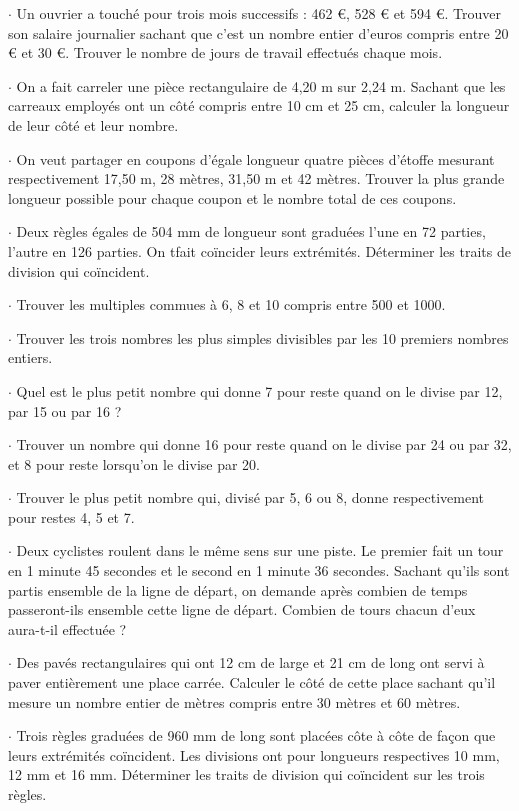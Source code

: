 $\cdot$    Un ouvrier a touché pour trois mois successifs : 462 €, 528 € et 594 €. Trouver son salaire journalier sachant que c'est un nombre entier d'euros compris entre 20 € et 30 €. Trouver le nombre de jours de travail effectués chaque mois. 
 
$\cdot$  On a fait carreler une pièce rectangulaire de 4,20 m sur 2,24 m. Sachant que les carreaux employés ont un côté compris entre 10 cm et 25 cm, calculer la longueur de leur côté et leur nombre. 

$\cdot$  On veut partager en coupons d'égale longueur quatre pièces d'étoffe mesurant respectivement 17,50 m, 28 mètres, 31,50 m et 42 mètres. Trouver la plus grande longueur possible pour chaque coupon et le nombre total de ces coupons. 
 
$\cdot$   Deux règles égales de 504 mm de longueur sont graduées l'une en 72 parties, l'autre en  126 parties. On tfait coïncider  leurs extrémités. Déterminer les traits de division qui coïncident.
 
$\cdot$  Trouver les multiples commues à 6, 8 et 10 compris entre 500 et 1000. 

$\cdot$  Trouver les trois nombres les plus simples divisibles par les 10 premiers nombres entiers. 
 
$\cdot$  Quel est le plus petit nombre qui donne 7 pour reste quand on le divise par 12, par 15 ou par 16 ? 
 
$\cdot$  Trouver un nombre qui donne 16 pour reste quand on le divise par 24 ou par 32, et 8 pour reste lorsqu'on le divise par 20. 
 
$\cdot$   Trouver le plus petit nombre qui, divisé par 5, 6 ou 8, donne respectivement pour restes 4, 5 et 7. 

$\cdot$   Deux cyclistes roulent dans le même sens sur une piste. Le premier fait un tour en 1 minute 45 secondes et le second en 1 minute 36 secondes. Sachant qu'ils sont partis ensemble de la ligne de départ, on demande après combien de temps passeront-ils ensemble cette ligne de départ. Combien de tours chacun d'eux aura-t-il effectuée ? 

$\cdot$   Des pavés rectangulaires qui ont 12 cm de large et 21 cm de long ont servi à paver entièrement une place carrée. Calculer le côté de cette place sachant qu'il mesure un nombre entier de mètres compris entre 30 mètres et 60 mètres. 
  
$\cdot$  Trois règles graduées de 960 mm de long sont placées côte à côte de façon que leurs extrémités coïncident. Les divisions ont pour longueurs respectives 10 mm, 12 mm et 16 mm. Déterminer les traits de division qui coïncident sur les trois règles. 
  
